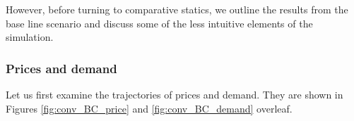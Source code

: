 However, before turning to comparative statics, we outline the results from
the base line scenario and discuss some of the less intuitive elements of
the simulation.

\subsubsection{Prices and demand}

\label{sec:prices-demand}

Let us first examine the trajectories of prices and demand. They are shown
in Figures \ref{fig:conv_BC_price} and \ref{fig:conv_BC_demand} overleaf.

\begin{figure}[]
\centering
{} 
\end{figure}
